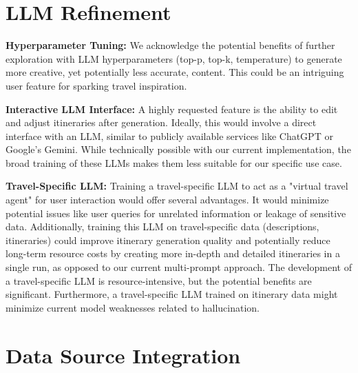 \documentclass[12pt,a4paper]{report}
\begin{document}
\section{LLM Refinement}
\begin{description}
\item{\textbf{Hyperparameter Tuning:} We acknowledge the potential benefits of further exploration with LLM hyperparameters (top-p, top-k, temperature) to generate more creative, yet potentially less accurate, content. This could be an intriguing user feature for sparking travel inspiration.}
\item{\textbf{Interactive LLM Interface:} A highly requested feature is the ability to edit and adjust itineraries after generation. Ideally, this would involve a direct interface with an LLM, similar to publicly available services like ChatGPT or Google's Gemini. While technically possible with our current implementation, the broad training of these LLMs makes them less suitable for our specific use case.}
\item{\textbf{Travel-Specific LLM:} Training a travel-specific LLM to act as a "virtual travel agent" for user interaction would offer several advantages. It would minimize potential issues like user queries for unrelated information or leakage of sensitive data. Additionally, training this LLM on travel-specific data (descriptions, itineraries) could improve itinerary generation quality and potentially reduce long-term resource costs by creating more in-depth and detailed itineraries in a single run, as opposed to our current multi-prompt approach. The development of a travel-specific LLM is resource-intensive, but the potential benefits are significant. Furthermore, a travel-specific LLM trained on itinerary data might minimize current model weaknesses related to hallucination.}
\end{description}

\section{Data Source Integration}
\end{document}

